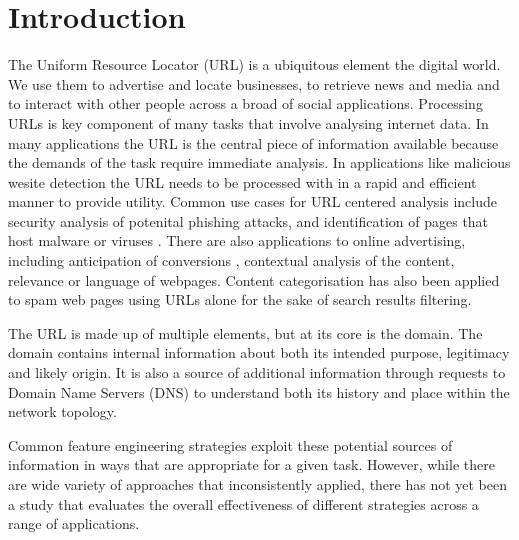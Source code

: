 \documentclass[sigconf]{acmart}
\begin{document}


\maketitle

\section{Introduction}

The Uniform Resource Locator (URL) is a ubiquitous element the digital world. 
We use them to advertise and locate businesses, to retrieve news and media and 
to interact with other people across a broad of social applications.
Processing URLs is key component of many tasks that involve
analysing internet data. In many applications the URL is the central piece of 
information available because the demands of the task require immediate analysis.
In applications like malicious wesite detection the URL needs to be processed with
in a rapid and efficient manner to provide utility\cite{Ma2009b}.
Common use cases for URL centered analysis include security analysis of potenital phishing 
attacks\cite{Garera2007,Basnet2012,Basnet2014,Mamun2016,Verma2017,Vazhayil2018,Tupsamudre2019,Li2020}, 
and identification of pages that host malware or viruses \cite{Canali2011,Mamun2016}.
There are also applications to online advertising,
including anticipation of conversions \cite{Qiu2020}, contextual analysis of
the content\cite{Kan2004,Shih2004,Baykan2009,Meshkizadeh2010,Hernandez2012,Arya2016}, relevance \cite{Kan2005} 
or language\cite{Baykan2013} of webpages. 
Content categorisation has also been applied to spam web pages using URLs alone for the sake
of search results filtering\cite{Chung2010}.

The URL is made up of multiple elements, but at its core is the domain. The domain
contains internal information about both its intended purpose, legitimacy and likely
origin. It is also a source of additional information through requests to Domain Name
Servers (DNS) to understand both its history and place within the network topology.

Common feature engineering strategies exploit these potential sources of information
in ways that are appropriate for a given task. However, while there are wide variety
of approaches that inconsistently applied, there has not yet been a study that evaluates
the overall effectiveness of different strategies across a range of applications.
\end{document}

